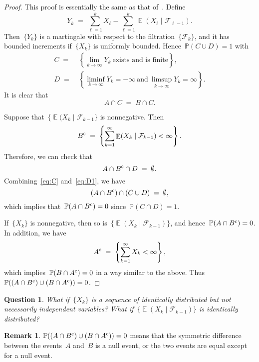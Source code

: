 \documentclass[12pt,a4paper]{article}  %
\newcounter{cite}
\newtheorem{question}{Question}[section]
\theoremstyle{definition}
\newtheorem{remark}{Remark}[section]
\numberwithin{equation}{section}
\newcommand{\FF}{\mathcal{F}}
\newcommand{\comp}{{\textnormal{c}}}
\DeclareMathOperator{\expc}{\mathbb{E}}
\renewcommand{\Pr}{\mathbb{P}}
\begin{document}
\begin{proof}
    This proof is essentially the same as that of~\cite[Theorem~4.3.4]{Durrett_2019}.
    Define
    \[
        Y_k \;=\;  \sum_{\ell = 1}^{k} X_\ell - \sum_{\ell = 1}^{k} \expc(X_\ell\mathrel{|}
        \FF_{\ell-1}).
    \]
    Then~$\{Y_k\}$ is a martingale with respect to the filtration~$\{\FF_k\}$, and it has bounded
    increments if~$\{X_k\}$ is uniformly bounded.
    Hence~$\Pr(C\cup D) = 1$ with
    \begin{align*}
        C \;=\; & \left\{ \lim_{k\to\infty} Y_k~\text{exists and is finite} \right\}, \\
        D \;=\; & \left\{ \liminf_{k\to \infty} Y_k = -\infty~\text{and}~\limsup_{k\to \infty} Y_k = \infty \right\}.
    \end{align*}
    It is clear that
    \begin{equation}
        \label{eq:C}
        A\cap C \;=\; B\cap C.
    \end{equation}

    Suppose that~$\{\expc(X_k\mathrel{|}\FF_{k-1}\}$ is nonnegative. Then
        \[
            B^\comp \;=\;  \left\{ \sum_{k=1}^\infty \expc(X_k\mathrel{|}\FF_{k-1}) <\infty \right\}.
        \]
    Therefore, we can check that
    \begin{equation}
        \label{eq:D1}
        A \cap B^\comp \cap D \;=\; \emptyset.
    \end{equation}
    Combining~\eqref{eq:C} and~\eqref{eq:D1}, we have
    \[
        (A \cap B^\comp) \cap (C\cup D) \;=\; \emptyset,
    \]
    which implies that~$\Pr(A\cap B^\comp) = 0$ since~$\Pr(C\cap D) = 1$.

    If~$\{X_k\}$ is nonnegative,  then so is~$\{\expc(X_k\mathrel{|}\FF_{k-1})\}$,
    and hence~$\Pr(A\cap B^\comp) = 0$. In addition, we have
    \[
        A^\comp \;=\;  \left\{ \sum_{k=1}^\infty X_k <\infty \right\},
    \]
    which implies~$\Pr(B\cap A^\comp) = 0$ in a way similar to the above.
    Thus~$\Pr((A \cap B^\comp) \cup (B\cap A^\comp)) = 0$.
\end{proof}

\begin{question}
    What if~$\{X_k\}$ is a sequence of identically distributed but not necessarily independent
    variables? What if~$\{\expc(X_k\mathrel{|}\FF_{k-1})\}$ is identically distributed?
\end{question}

\begin{remark}
    \label{rem:equal}
     $\Pr((A \cap B^\comp) \cup (B\cap A^\comp)) = 0$ means that the symmetric difference between
     the events~$A$ and~$B$ is a null event, or the two events are equal except for a null event.
\end{remark}
\end{document}
